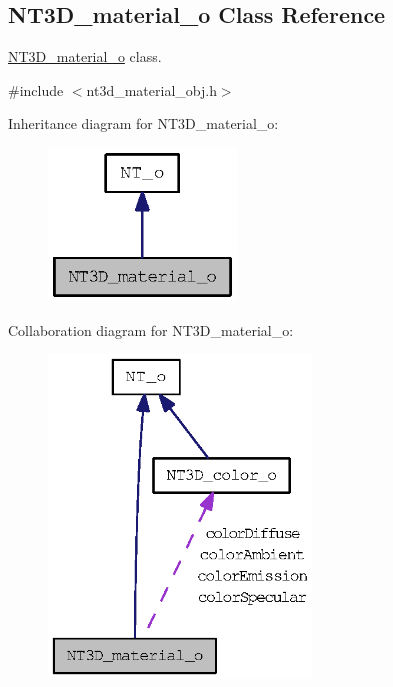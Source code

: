 \subsection{NT3D\_\-material\_\-o Class Reference}
\label{class_n_t3_d__material__o}


\hyperlink{class_n_t3_d__material__o}{NT3D\_\-material\_\-o} class.  




{\ttfamily \#include $<$nt3d\_\-material\_\-obj.h$>$}



Inheritance diagram for NT3D\_\-material\_\-o:
\nopagebreak
\begin{figure}[H]
\begin{center}
\leavevmode
\includegraphics[width=142pt]{class_n_t3_d__material__o__inherit__graph}
\end{center}
\end{figure}


Collaboration diagram for NT3D\_\-material\_\-o:
\nopagebreak
\begin{figure}[H]
\begin{center}
\leavevmode
\includegraphics[width=198pt]{class_n_t3_d__material__o__coll__graph}
\end{center}
\end{figure}
